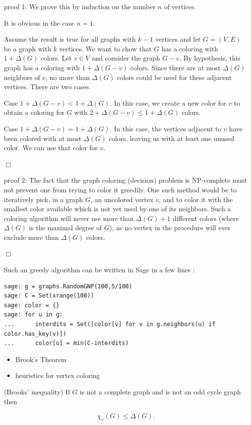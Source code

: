 proof 1:
We prove this by induction on the number $n$ of vertices.

It is obvious in the case $n=1$.

Assume the result is true for all graphs with $k-1$ vertices and let
$G=(V,E)$ be a graph with $k$ vertices. We want to chow that $G$ has a
coloring with $1+\Delta(G)$ colors. Let $v\in V$ and consider the
graph $G-v$. By hypothesis, this graph has a coloring with
$1+\Delta(G-v)$ colors. Since there are at most $\Delta(G)$
neighbors of $v$, no more than $\Delta(G)$ colors could be used for 
these adjacent vertices. There are two cases.

Case $1+\Delta(G-v) < 1+\Delta(G)$. In this case, we create a new
color for $v$ to obtain a coloring for $G$ with 
$2+\Delta(G-v) \leq 1+\Delta(G)$ colors.

Case $1+\Delta(G-v) = 1+\Delta(G)$. In this case, the vertices adjacent to
$v$ have been colored with at most $\Delta(G)$ colors, leaving us with
at least one unused color. We can use that color for $v$.

$\Box$

proof 2: The fact that the graph coloring (decision) problem
is NP-complete must not prevent one from trying to 
color it greedily. One such 
method would be to iteratively pick, in a graph $G$, an uncolored 
vertex $v$, and to color it with the smallest color available which 
is not yet used by one of its neighbors. 
Such a coloring algorithm will never 
use more than $\Delta(G)+1$ different 
colors (where $\Delta(G)$ is the maximal degree of $G$), as
no vertex in the procedure will ever exclude more than 
$\Delta(G)$ colors.

$\Box$

Such an greedy algorithm can be written in Sage in a few lines :

\begin{lstlisting}
sage: g = graphs.RandomGNP(100,5/100)
sage: C = Set(xrange(100))
sage: color = {}
sage: for u in g:
...      interdits = Set([color[v] for v in g.neighbors(u) if color.has_key(v)])
...      color[u] = min(C-interdits)
\end{lstlisting}

\begin{itemize}
\item Brook's Theorem
\item heuristics for vertex coloring
\end{itemize}

\begin{theorem}  
(Brooks' inequality)
If $G$ is not a complete graph and is not an odd cycle graph then

\[
    \chi_v(G) \le \Delta(G). 
\]
\end{theorem}

